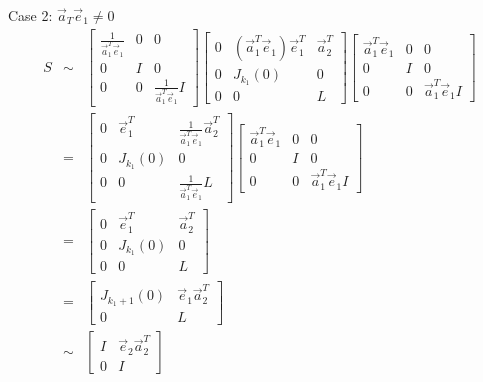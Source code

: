 \documentclass[letterpaper,12pt,fleqn]{article}
\newcommand{\va}{\vec{a}}
\newcommand{\ve}{\vec{e}}
\begin{document}
\begin{theproof}
\begin{description}
\begin{description}
    \item Case 2: $\va_T\ve_1\ne0$
      \begin{eqnarray*}
        S &\sim& \begin{bmatrix}
          \frac{1}{\va_1^T\ve_1} & 0 & 0 \\
          0 & I & 0 \\
          0 & 0 & \frac{1}{\va_1^T\ve_1}I
        \end{bmatrix}
        \begin{bmatrix}
          0 & (\va_1^T\ve_1)\ve_1^T & \va_2^T \\
          0 & J_{k_1}(0) & 0 \\
          0 & 0 & L
        \end{bmatrix}
        \begin{bmatrix}
          \va_1^T\ve_1 & 0 & 0 \\
          0 & I & 0 \\
          0 & 0 & \va_1^T\ve_1I
        \end{bmatrix} \\
        &=& \begin{bmatrix}
          0 & \ve_1^T & \frac{1}{\va_1^T\ve_1}\va_2^T \\
          0 & J_{k_1}(0) & 0 \\
          0 & 0 & \frac{1}{\va_1^T\ve_1}L
        \end{bmatrix}
        \begin{bmatrix}
          \va_1^T\ve_1 & 0 & 0 \\
          0 & I & 0 \\
          0 & 0 & \va_1^T\ve_1I
        \end{bmatrix} \\
        &=& \begin{bmatrix}
          0 & \ve_1^T & \va_2^T \\
          0 & J_{k_1}(0) & 0 \\
          0 & 0 & L
        \end{bmatrix} \\
        &=& \begin{bmatrix}
          J_{k_1+1}(0) & \ve_1\va_2^T \\
          0 & L
        \end{bmatrix} \\
        &\sim& \begin{bmatrix}
          I & \ve_2\va_2^T \\
          0 & I
        \end{bmatrix}

\end{eqnarray*}
\end{description}
\end{description}
\end{theproof}
\end{document}
